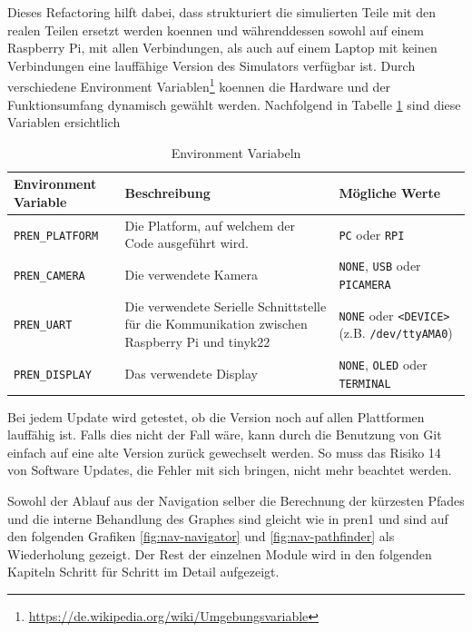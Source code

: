 Dieses Refactoring hilft dabei, dass strukturiert die simulierten Teile mit den realen Teilen ersetzt werden koennen und währenddessen sowohl auf einem Raspberry Pi, mit allen Verbindungen, als auch auf einem Laptop mit keinen Verbindungen eine lauffähige Version des Simulators verfügbar ist.
Durch verschiedene Environment Variablen\footnote{\url{https://de.wikipedia.org/wiki/Umgebungsvariable}} koennen die Hardware und der Funktionsumfang dynamisch gewählt werden. Nachfolgend in Tabelle \ref{table:environment-variables} sind diese Variablen ersichtlich


\begin{table}[H]
    \centering
    \begin{tabularx}{\textwidth}{|X|X|X|}
    \hline
        \textbf{Environment Variable} & \textbf{Beschreibung} & \textbf{Mögliche Werte}\\
        \hline
         \verb|PREN_PLATFORM| & Die Platform, auf welchem der Code ausgeführt wird. & \verb|PC| oder \verb|RPI| \\
         \hline
         \verb|PREN_CAMERA| & Die verwendete Kamera & \verb|NONE|, \verb|USB| oder \verb|PICAMERA| \\
         \hline
         \verb|PREN_UART| & Die verwendete Serielle Schnittstelle für die Kommunikation zwischen Raspberry Pi und \gls{tinyk22} & \verb|NONE| oder \verb|<DEVICE>| \newline (z.B. \verb|/dev/ttyAMA0|) \\
         \hline
         \verb|PREN_DISPLAY| & Das verwendete Display &  \verb|NONE|, \verb|OLED| oder \verb|TERMINAL|  \\
         \hline
    \end{tabularx}
    \caption{Environment Variabeln}
    \label{table:environment-variables}
\end{table}

Bei jedem Update wird getestet, ob die Version noch auf allen Plattformen lauffähig ist. Falls dies nicht der Fall wäre, kann durch die Benutzung von Git einfach auf eine alte Version zurück gewechselt werden. So muss das Risiko 14 von Software Updates, die Fehler mit sich bringen, nicht mehr beachtet werden.

Sowohl der Ablauf aus der Navigation selber die Berechnung der kürzesten Pfades und die interne Behandlung des Graphes sind gleicht wie in \acrshort{pren1} und sind auf den folgenden Grafiken \ref{fig:nav-navigator} und \ref{fig:nav-pathfinder} als Wiederholung gezeigt. Der Rest der einzelnen Module wird in den folgenden Kapiteln Schritt für Schritt im Detail aufgezeigt.

